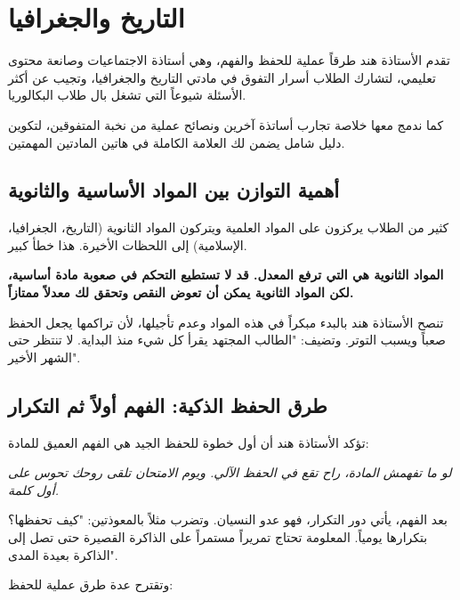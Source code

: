 \documentclass[12pt,a4paper]{book}
\newcommand{\quoteAr}[1]{%
	\begin{myquote}
		\itshape #1
	\end{myquote}
}
\newcommand{\importantAr}[1]{%
	\begin{important}
		\bfseries #1
	\end{important}
}
\begin{document}
	
	\section{  التاريخ والجغرافيا }
	
تقدم الأستاذة هند طرقاً عملية للحفظ والفهم، وهي أستاذة الاجتماعيات وصانعة محتوى تعليمي، لتشارك الطلاب أسرار التفوق في مادتي التاريخ والجغرافيا، وتجيب عن أكثر الأسئلة شيوعاً التي تشغل بال طلاب البكالوريا.
	
	كما ندمج معها خلاصة تجارب أساتذة آخرين ونصائح عملية من نخبة المتفوقين، لتكوين دليل شامل يضمن لك العلامة الكاملة في هاتين المادتين المهمتين.
	
	\subsection{أهمية التوازن بين المواد الأساسية والثانوية}
	
	كثير من الطلاب يركزون على المواد العلمية ويتركون المواد الثانوية (التاريخ، الجغرافيا، الإسلامية) إلى اللحظات الأخيرة. هذا خطأ كبير.
	
	\importantAr{المواد الثانوية هي التي ترفع المعدل. قد لا تستطيع التحكم في صعوبة مادة أساسية، لكن المواد الثانوية يمكن أن تعوض النقص وتحقق لك معدلاً ممتازاً.}
	
	تنصح الأستاذة هند بالبدء مبكراً في هذه المواد وعدم تأجيلها، لأن تراكمها يجعل الحفظ صعباً ويسبب التوتر. وتضيف: "الطالب المجتهد يقرأ كل شيء منذ البداية. لا تنتظر حتى الشهر الأخير".
	
	\subsection{طرق الحفظ الذكية: الفهم أولاً ثم التكرار}
	
	تؤكد الأستاذة هند أن أول خطوة للحفظ الجيد هي الفهم العميق للمادة:
	
	\quoteAr{لو ما تفهمش المادة، راح تقع في الحفظ الآلي. ويوم الامتحان تلقى روحك تحوس على أول كلمة.}
	
	بعد الفهم، يأتي دور التكرار، فهو عدو النسيان. وتضرب مثلاً بالمعوذتين: "كيف تحفظها؟ بتكرارها يومياً. المعلومة تحتاج تمريراً مستمراً على الذاكرة القصيرة حتى تصل إلى الذاكرة بعيدة المدى".
	
	وتقترح عدة طرق عملية للحفظ:
	
\end{document}
